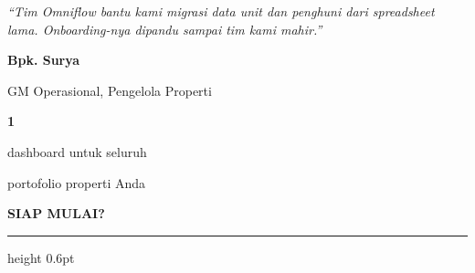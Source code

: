 \documentclass[a4paper]{article}
\newcommand{\sectiontitle}[1]{%
    \vspace{10pt}%
    {\fontsize{13}{16}\selectfont\bfseries\color{BlueDark} #1}\par\vspace{3pt}%
    {\color{BluePrimary}\hrule height 0.6pt}\par\vspace{8pt}%
}
\begin{document}
\noindent
\begin{minipage}[t]{0.485\textwidth}
    \colorbox{BlueBg}{%
        \begin{minipage}{\dimexpr\linewidth-2\fboxsep\relax}
            {\fontsize{9.5}{13}\selectfont\color{TextDark}\textit{``Tim Omniflow bantu kami migrasi data unit dan penghuni dari spreadsheet lama. Onboarding-nya dipandu sampai tim kami mahir.''}}\par\vspace{4pt}
            {\fontsize{8.5}{11}\selectfont\bfseries\color{BluePrimary} Bpk. Surya}\par
            {\fontsize{8}{10}\selectfont\color{TextLight} GM Operasional, Pengelola Properti}
        \end{minipage}}
\end{minipage}%
\hfill
\begin{minipage}[t]{0.485\textwidth}
    \colorbox{BlueBg}{%
        \begin{minipage}{\dimexpr\linewidth-2\fboxsep\relax}
            \begin{center}
                {\fontsize{20}{24}\selectfont\bfseries\color{BluePrimary} 1}\par
                {\fontsize{9.5}{12}\selectfont\color{TextDark} dashboard untuk seluruh}\par
                {\fontsize{9.5}{12}\selectfont\color{TextDark} portofolio properti Anda}
            \end{center}
        \end{minipage}}
\end{minipage}

\sectiontitle{SIAP MULAI?}
\end{document}
